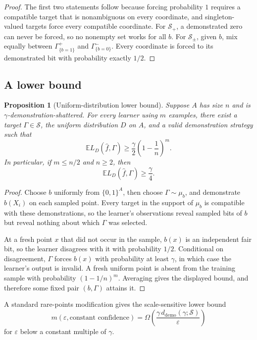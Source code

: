 \documentclass[11pt]{article}
\newtheorem{proposition}[theorem]{Proposition}
\theoremstyle{definition}
\theoremstyle{remark}
\newcommand{\Y}{\{0,1\}}
\newcommand{\SV}{\mathcal S}
\newcommand{\eps}{\varepsilon}
\newcommand{\ddemo}{d_{\mathrm{demo}}}
\newcommand{\1}{\mathbf 1}
\begin{document}
\begin{proof}
The first two statements follow because forcing probability $1$ requires a compatible target that is nonambiguous on every coordinate, and singleton-valued targets force every compatible coordinate. For $\SV_+$, a demonstrated zero can never be forced, so no nonempty set works for all $b$. For $\SV_{\pm}$, given $b$, mix equally between $\Gamma^+_{\{b=1\}}$ and $\Gamma^-_{\{b=0\}}$. Every coordinate is forced to its demonstrated bit with probability exactly $1/2$.
\end{proof}

\subsection{A lower bound}

\begin{proposition}[Uniform-distribution lower bound]
Suppose $A$ has size $n$ and is $\gamma$-demonstration-shattered. For every learner using $m$ examples, there exist a target $\Gamma\in\SV$, the uniform distribution $D$ on $A$, and a valid demonstration strategy such that
\[
    \mathbb E L_D(\widehat f,\Gamma)
    \geq
    \frac{\gamma}{2}\left(1-\frac1n\right)^m.
\]
In particular, if $m\leq n/2$ and $n\geq2$, then
\[
    \mathbb E L_D(\widehat f,\Gamma)\geq\frac{\gamma}{4}.
\]
\end{proposition}

\begin{proof}
Choose $b$ uniformly from $\Y^A$, then choose $\Gamma\sim\mu_b$, and demonstrate $b(X_i)$ on each sampled point. Every target in the support of $\mu_b$ is compatible with these demonstrations, so the learner's observations reveal sampled bits of $b$ but reveal nothing about which $\Gamma$ was selected.

At a fresh point $x$ that did not occur in the sample, $b(x)$ is an independent fair bit, so the learner disagrees with it with probability $1/2$. Conditional on disagreement, $\Gamma$ forces $b(x)$ with probability at least $\gamma$, in which case the learner's output is invalid. A fresh uniform point is absent from the training sample with probability $(1-1/n)^m$. Averaging gives the displayed bound, and therefore some fixed pair $(b,\Gamma)$ attains it.
\end{proof}

A standard rare-points modification gives the scale-sensitive lower bound
\[
    m(\eps,\text{constant confidence})
    =
    \Omega\!\left(
        \frac{\gamma\,\ddemo(\gamma;\SV)}{\eps}
    \right)
\]
for $\eps$ below a constant multiple of $\gamma$.
\end{document}
